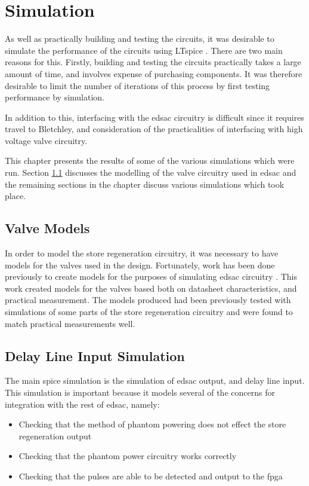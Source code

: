 \section{ Simulation}
As well as practically building and testing the circuits, it was desirable to simulate the performance of the circuits using LTspice \cite{linear2017}. There are two main reasons for this. Firstly, building and testing the circuits practically takes a large amount of time, and involves expense of purchasing components. It was therefore desirable to limit the number of iterations of this process by first testing performance by simulation.

In addition to this, interfacing with the \gls{edsac} circuitry is difficult since it requires travel to Bletchley, and consideration of the practicalities of interfacing with high voltage valve circuitry.

This chapter presents the results of some of the various simulations which were run. Section \ref{sec:spice-valve-models} discusses the modelling of the valve circuitry used in \gls{edsac} and the remaining sections in the chapter discuss various simulations which took place.

\subsection{Valve Models} \label{sec:spice-valve-models}

In order to model the store regeneration circuitry, it was necessary to have models for the valves used in the design. Fortunately, work has been done previously to create models for the purposes of simulating \gls{edsac} circuitry \cite{linnington2015}. This work created models for the valves based both on datasheet characteristics, and practical measurement. The models produced had been previously tested with simulations of some parts of the store regeneration circuitry and were found to match practical measurements well.

\subsection{Delay Line Input Simulation}
The main \gls{spice} simulation is the simulation of \gls{edsac} output, and delay line input. This simulation is important because it models several of the concerns for integration with the rest of \gls{edsac}, namely:
\begin{itemize}
	\item Checking that the method of phantom powering does not effect the store regeneration output
	\item Checking that the phantom power circuitry works correctly
	\item Checking that the pulses are able to be detected and output to the \gls{fpga}
\end{itemize}

